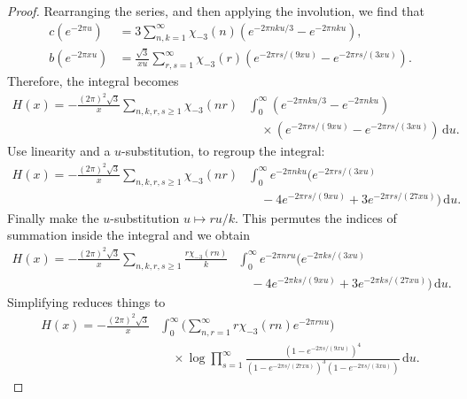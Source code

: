 \documentclass[12pt,reqno]{amsart}
\theoremstyle{remark}
\begin{document}
\begin{proof}
Rearranging the series, and then applying the involution, we find that
\begin{align}
c\left(e^{-2\pi u}\right)
&=3\sum_{n,k=1}^{\infty}\chi_{-3}(n)(e^{-2\pi n k u/3}-e^{-2\pi n k u}),
\\
b\left(e^{-2\pi x u}\right)
&=\frac{\sqrt{3}}{xu}\sum_{r,s=1}^{\infty}\chi_{-3}(r)(e^{-2\pi r s/(9 x u)}-e^{-2\pi r s/(3 x u)}).
\end{align}
Therefore, the integral becomes
\begin{equation*}
\begin{split}
H(x)=-\frac{(2\pi)^2\sqrt{3}}{x}\sum_{n,k,r,s\ge 1}\chi_{-3}(nr)
&\int_{0}^{\infty}(e^{-2\pi n k u/3}-e^{-2\pi n ku})
\\ &\quad\times
(e^{-2\pi r s/(9x u)}-e^{-2\pi r s/(3x u)})\, {{\mathrm d}} u.
\end{split}
\end{equation*}
Use linearity and a $u$-substitution, to regroup the integral:
\begin{equation*}
\begin{split}
H(x)=-\frac{(2\pi)^2\sqrt{3}}{x}\sum_{n,k,r,s\ge 1}\chi_{-3}(nr)
&\int_{0}^{\infty}e^{-2\pi n k u}(e^{-2\pi r s/(3xu)}
\\ &\quad
-4e^{-2\pi r s/(9x u)}+3e^{-2\pi r s/(27x u)})\, {{\mathrm d}} u.
\end{split}
\end{equation*}
Finally make the $u$-substitution $u\mapsto r u/k$. This
permutes the indices of summation inside the integral and we obtain
\begin{equation*}
\begin{split}
H(x)=-\frac{(2\pi)^2\sqrt{3}}{x}\sum_{n,k,r,s\ge 1}\frac{r\chi_{-3}(rn)}{k}
&\int_{0}^{\infty}e^{-2\pi n r u} \bigl(e^{-2\pi k s/(3xu)}
\\ &\quad
-4e^{-2\pi k s/(9x u)}+3e^{-2\pi k s/(27x u)}\bigr)\, {{\mathrm d}} u.
\end{split}
\end{equation*}
Simplifying reduces things to
\begin{equation*}
\begin{split}
H(x)=-\frac{(2\pi)^2\sqrt{3}}{x}
&\int_{0}^{\infty}\biggl(\sum_{n,r=1}^{\infty}r\chi_{-3}(r n)e^{-2\pi r n u}\biggr)
\\ &\quad\times
\log\prod_{s=1}^{\infty}\frac{(1-e^{-2\pi s/(9 x u)})^4}
{(1-e^{-2\pi s/(27x u)})^3(1-e^{-2\pi s/(3 x u)})}\,{{\mathrm d}} u.
\end{split}
\end{equation*}

\end{proof}
\end{document}
